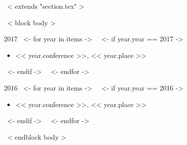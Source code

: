 ~< extends "section.tex" >~

~< block body >~

2017
~<- for year in items ->~
~<- if year.year == 2017 ->~
\begin{itemize}
  \item << year.conference >>, << year.place >>
\end{itemize}
~<- endif ->~
~<- endfor ->~

2016
~<- for year in items ->~
~<- if year.year == 2016 ->~
\begin{itemize}
  \item << year.conference >>, << year.place >>
\end{itemize}
~<- endif ->~
~<- endfor ->~

~< endblock body >~


